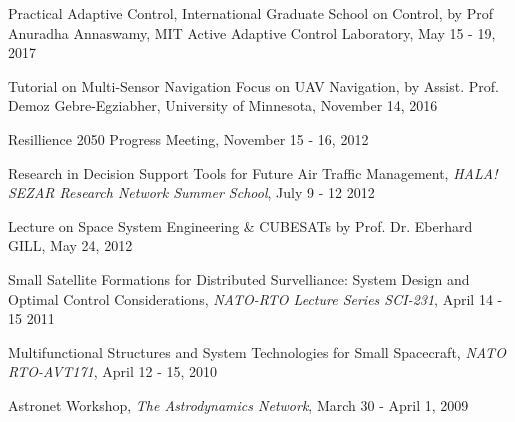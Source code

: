 \documentclass[margin,line]{res}
\newenvironment{list2}{
  \begin{list}{$\bullet$}{
      \setlength{\itemsep}{0in}
      \setlength{\parsep}{0in} \setlength{\parskip}{0in}
      \setlength{\topsep}{0in} \setlength{\partopsep}{0in}
      \setlength{\leftmargin}{0.2in}}}{\end{list}}
\begin{document}
\begin{resume}
Practical Adaptive Control, International Graduate School on Control, by Prof Anuradha Annaswamy, MIT Active Adaptive Control Laboratory, May 15 - 19, 2017
\vspace*{-.05in}

Tutorial on Multi-Sensor Navigation Focus on UAV Navigation, by Assist. Prof. Demoz Gebre-Egziabher, University of Minnesota, November 14, 2016
\vspace*{-.05in}

Resillience 2050 Progress Meeting, November 15 - 16, 2012
\vspace*{-.05in}

Research in Decision Support Tools for Future Air Traffic Management, {\it HALA! SEZAR Research Network Summer School}, July 9 - 12 2012
\vspace*{-.05in}

Lecture on Space System Engineering \& CUBESATs by Prof. Dr. Eberhard GILL, May 24, 2012
\vspace*{-.05in}

Small Satellite Formations for Distributed Survelliance: System Design and Optimal Control Considerations, {\it NATO-RTO Lecture Series SCI-231}, April 14 - 15 2011
\vspace*{-.05in}

Multifunctional Structures and System Technologies for Small Spacecraft, {\it NATO RTO-AVT171}, April 12 - 15, 2010
\vspace*{-.05in}

Astronet Workshop, {\it The Astrodynamics Network}, March 30 - April 1, 2009 




\end{resume}
\end{document}

